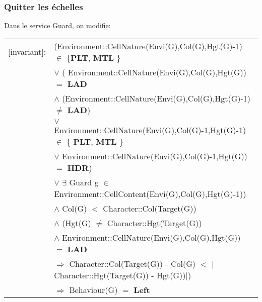 \documentclass[8pt]{article}
\begin{document}
\subsubsection{Quitter les échelles}
Dans le service \textrm{Guard}, on modifie:
{\small
\begin{longtable}{rl}
  \textrm{[invariant]}:& (\textrm{Environment::CellNature(Envi(G),Col(G),Hgt(G)-1)} $\in$ \{\textbf{PLT}, \textbf{MTL}  \} \\
  & \quad\quad\quad\quad $\lor$ ( \textrm{Environment::CellNature(Envi(G),Col(G),Hgt(G))} $=$ \textbf{LAD} \\
  & \quad\quad\quad\quad\quad\quad $\land$ (\textrm{Environment::CellNature(Envi(G),Col(G),Hgt(G)-1)} $\neq$ \textbf{LAD}) \\
  & \quad\quad\quad\quad\quad\quad\quad\quad $\lor$ \textrm{Environment::CellNature(Envi(G),Col(G)-1,Hgt(G)-1)} $\in$ \{ \textbf{PLT}, \textbf{MTL} \}\\
  & \quad\quad\quad\quad\quad\quad\quad\quad $\lor$ \textrm{Environment::CellNature(Envi(G),Col(G)-1,Hgt(G))} $=$ \textbf{HDR})\\
  & \quad\quad\quad\quad $\lor$ $\exists$ \textrm{Guard} g $\in$ \textrm{Environment::CellContent(Envi(G),Col(G),Hgt(G)-1)}) \\
  & \quad\quad $\land$ \textrm{Col(G)} $<$ \textrm{Character::Col(Target(G))} \\
  & \quad\quad $\land$ (\textrm{Hgt(G)} $\neq$ \textrm{Character::Hgt(Target(G))} \\
  & \quad\quad\quad\quad $\land$ \textrm{Environment::CellNature(Envi(G),Col(G),Hgt(G))} $=$ \textbf{LAD}\\
  & \quad\quad\quad\quad $\Rightarrow$ \textrm{Character::Col(Target(G)) - Col(G)} $<$ $|$\textrm{Character::Hgt(Target(G)) - Hgt(G)})$|$) \\
  & \quad\quad $\Rightarrow$ \textrm{Behaviour(G)} $=$ \textbf{Left} \\ 


\end{longtable}}
\end{document}
